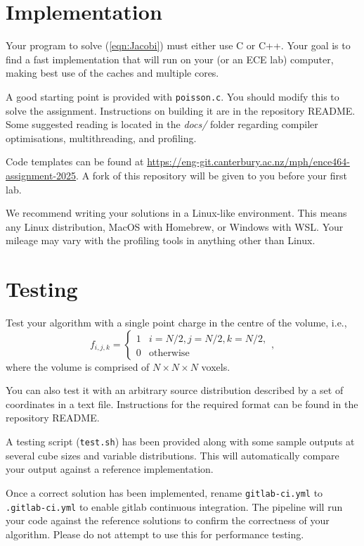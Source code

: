\documentclass[a4paper,11pt]{article}
\newcommand{\code}[1]{\texttt{#1}}
\begin{document}
\section{Implementation}

Your program to solve (\ref{eqn:Jacobi}) must either use C or C++.
Your goal is to find a fast implementation that will run on your (or
an ECE lab) computer, making best use of the caches and multiple
cores.

A good starting point is provided with \code{poisson.c}. You should
modify this to solve the assignment.  Instructions on building it are
in the repository README.  Some suggested reading is located in the
\emph{docs/} folder regarding compiler optimisations, multithreading,
and profiling.

Code templates can be found at
\url{https://eng-git.canterbury.ac.nz/mph/ence464-assignment-2025}. 
A fork of this repository will be given to you before your first lab.

We recommend writing your solutions in a Linux-like environment. This
means any Linux distribution, MacOS with Homebrew, or Windows with
WSL. Your mileage may vary with the profiling tools in anything other
than Linux.


\section{Testing}

Test your algorithm with a single point charge in the centre of the
volume, i.e.,
%
\begin{equation}
  f_{i,j,k} = \left\{
  \begin{array}{ll}
    1 & i=N/2, j=N/2, k=N/2, \\
    0 & \mbox{otherwise}
  \end{array}\right.,
\end{equation}
%
where the volume is comprised of $N \times N \times N$ voxels.  

You can also test it with an arbitrary source distribution described
by a set of coordinates in a text file. Instructions for the required
format can be found in the repository README.

A testing script (\code{test.sh}) has been provided along with some sample
outputs at several cube sizes and variable distributions. This will 
automatically compare your output against a reference implementation.

Once a correct solution has been implemented, rename
\code{gitlab-ci.yml} to \code{.gitlab-ci.yml} to enable gitlab continuous
integration. The pipeline will run your code against the reference
solutions to confirm the correctness of your algorithm. Please do not
attempt to use this for performance testing.
\end{document}
